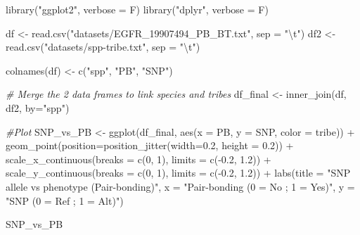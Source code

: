 \documentclass[
]{article}
\newenvironment{Shaded}{\begin{snugshade}}{\end{snugshade}}
\newcommand{\AttributeTok}[1]{\textcolor[rgb]{0.77,0.63,0.00}{#1}}
\newcommand{\CommentTok}[1]{\textcolor[rgb]{0.56,0.35,0.01}{\textit{#1}}}
\newcommand{\DecValTok}[1]{\textcolor[rgb]{0.00,0.00,0.81}{#1}}
\newcommand{\FloatTok}[1]{\textcolor[rgb]{0.00,0.00,0.81}{#1}}
\newcommand{\FunctionTok}[1]{\textcolor[rgb]{0.00,0.00,0.00}{#1}}
\newcommand{\NormalTok}[1]{#1}
\newcommand{\OtherTok}[1]{\textcolor[rgb]{0.56,0.35,0.01}{#1}}
\newcommand{\SpecialCharTok}[1]{\textcolor[rgb]{0.00,0.00,0.00}{#1}}
\newcommand{\StringTok}[1]{\textcolor[rgb]{0.31,0.60,0.02}{#1}}
\begin{document}
\begin{Shaded}
\begin{Highlighting}[]
\FunctionTok{library}\NormalTok{(}\StringTok{"ggplot2"}\NormalTok{, }\AttributeTok{verbose =}\NormalTok{ F)}
\FunctionTok{library}\NormalTok{(}\StringTok{"dplyr"}\NormalTok{, }\AttributeTok{verbose =}\NormalTok{ F)}

\NormalTok{df }\OtherTok{\textless{}{-}} \FunctionTok{read.csv}\NormalTok{(}\StringTok{"datasets/EGFR\_19907494\_PB\_BT.txt"}\NormalTok{, }\AttributeTok{sep =} \StringTok{"}\SpecialCharTok{\textbackslash{}t}\StringTok{"}\NormalTok{)}
\NormalTok{df2 }\OtherTok{\textless{}{-}} \FunctionTok{read.csv}\NormalTok{(}\StringTok{"datasets/spp{-}tribe.txt"}\NormalTok{, }\AttributeTok{sep =} \StringTok{"}\SpecialCharTok{\textbackslash{}t}\StringTok{"}\NormalTok{)}

\FunctionTok{colnames}\NormalTok{(df) }\OtherTok{\textless{}{-}} \FunctionTok{c}\NormalTok{(}\StringTok{"spp"}\NormalTok{, }\StringTok{"PB"}\NormalTok{, }\StringTok{"SNP"}\NormalTok{)}

\CommentTok{\# Merge the 2 data frames to link species and tribes}
\NormalTok{df\_final }\OtherTok{\textless{}{-}} \FunctionTok{inner\_join}\NormalTok{(df, df2, }\AttributeTok{by=}\StringTok{"spp"}\NormalTok{)}

\CommentTok{\#Plot}
\NormalTok{SNP\_vs\_PB }\OtherTok{\textless{}{-}} \FunctionTok{ggplot}\NormalTok{(df\_final, }\FunctionTok{aes}\NormalTok{(}\AttributeTok{x =}\NormalTok{ PB, }\AttributeTok{y =}\NormalTok{ SNP, }\AttributeTok{color =}\NormalTok{ tribe)) }\SpecialCharTok{+}
  \FunctionTok{geom\_point}\NormalTok{(}\AttributeTok{position=}\FunctionTok{position\_jitter}\NormalTok{(}\AttributeTok{width=}\FloatTok{0.2}\NormalTok{, }\AttributeTok{height =} \FloatTok{0.2}\NormalTok{)) }\SpecialCharTok{+}
  \FunctionTok{scale\_x\_continuous}\NormalTok{(}\AttributeTok{breaks =} \FunctionTok{c}\NormalTok{(}\DecValTok{0}\NormalTok{, }\DecValTok{1}\NormalTok{), }\AttributeTok{limits =} \FunctionTok{c}\NormalTok{(}\SpecialCharTok{{-}}\FloatTok{0.2}\NormalTok{, }\FloatTok{1.2}\NormalTok{)) }\SpecialCharTok{+}
  \FunctionTok{scale\_y\_continuous}\NormalTok{(}\AttributeTok{breaks =} \FunctionTok{c}\NormalTok{(}\DecValTok{0}\NormalTok{, }\DecValTok{1}\NormalTok{), }\AttributeTok{limits =} \FunctionTok{c}\NormalTok{(}\SpecialCharTok{{-}}\FloatTok{0.2}\NormalTok{, }\FloatTok{1.2}\NormalTok{)) }\SpecialCharTok{+}
  \FunctionTok{labs}\NormalTok{(}\AttributeTok{title =} \StringTok{"SNP allele vs phenotype (Pair{-}bonding)"}\NormalTok{,}
       \AttributeTok{x =} \StringTok{"Pair{-}bonding (0 = No ; 1 = Yes)"}\NormalTok{,}
       \AttributeTok{y =} \StringTok{"SNP (0 = Ref ; 1 = Alt)"}\NormalTok{)}

\NormalTok{SNP\_vs\_PB}
\end{Highlighting}
\end{Shaded}
\end{document}
